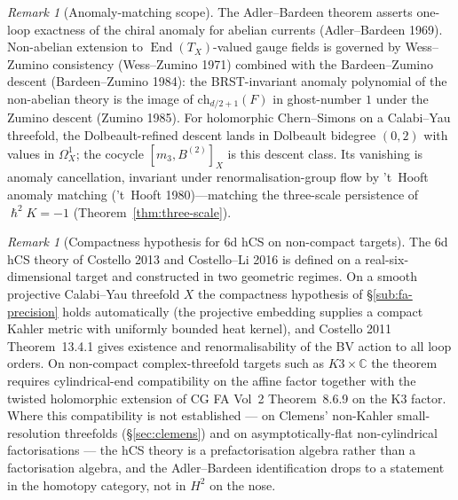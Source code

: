 \documentclass[11pt,reqno]{amsart}
\theoremstyle{plain}
\theoremstyle{definition}
\theoremstyle{remark}
\newtheorem{remark}[theorem]{Remark}
\DeclareMathOperator{\End}{End}
\newcommand{\Cbb}{\mathbb{C}}
\newcommand{\hbar}{{\hslash}}
\begin{document}
\begin{remark}[Anomaly-matching scope]
\label{rem:anomaly-matching}
The Adler--Bardeen theorem asserts one-loop exactness of the chiral anomaly for abelian currents (Adler--Bardeen 1969). Non-abelian extension to $\End(T_X)$-valued gauge fields is governed by Wess--Zumino consistency (Wess--Zumino 1971) combined with the Bardeen--Zumino descent (Bardeen--Zumino 1984): the BRST-invariant anomaly polynomial of the non-abelian theory is the image of $\mathrm{ch}_{d/2 + 1}(F)$ in ghost-number $1$ under the Zumino descent (Zumino 1985). For holomorphic Chern--Simons on a Calabi--Yau threefold, the Dolbeault-refined descent lands in Dolbeault bidegree $(0, 2)$ with values in $\Omega^1_X$; the cocycle $[m_3, B^{(2)}]_X$ is this descent class. Its vanishing is anomaly cancellation, invariant under renormalisation-group flow by 't~Hooft anomaly matching ('t~Hooft 1980)---matching the three-scale persistence of $\hbar^2 K = -1$ (Theorem~\ref{thm:three-scale}).
\end{remark}

\begin{remark}[Compactness hypothesis for 6d hCS on non-compact targets]
\label{rem:hcs-compactness}
The 6d hCS theory of Costello 2013 and Costello--Li 2016 is defined on a real-six-dimensional target and constructed in two geometric regimes. On a smooth projective Calabi--Yau threefold $X$ the compactness hypothesis of \S\ref{sub:fa-precision} holds automatically (the projective embedding supplies a compact Kahler metric with uniformly bounded heat kernel), and Costello 2011 Theorem~13.4.1 gives existence and renormalisability of the BV action to all loop orders. On non-compact complex-threefold targets such as $K3 \times \Cbb$ the theorem requires cylindrical-end compatibility on the affine factor together with the twisted holomorphic extension of CG FA Vol~2 Theorem~8.6.9 on the K3 factor. Where this compatibility is not established --- on Clemens' non-Kahler small-resolution threefolds (\S\ref{sec:clemens}) and on asymptotically-flat non-cylindrical factorisations --- the hCS theory is a prefactorisation algebra rather than a factorisation algebra, and the Adler--Bardeen identification drops to a statement in the homotopy category, not in $H^2$ on the nose.
\end{remark}
\end{document}
